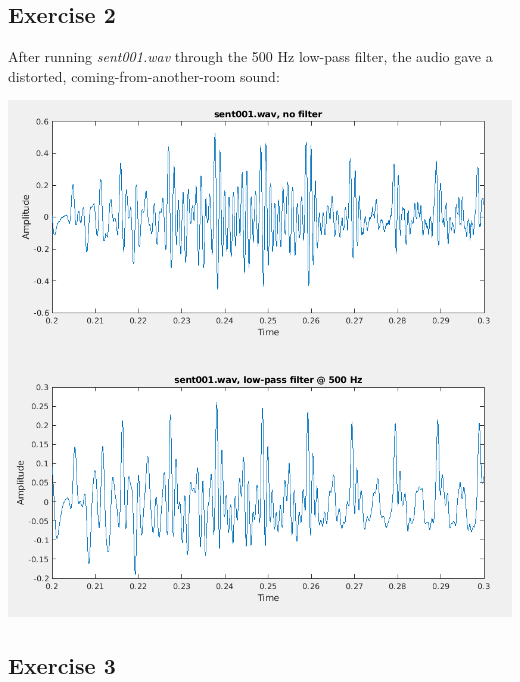 \documentclass[11pt]{article}
\begin{document}
\subsection{Exercise 2}

After running \textit{sent001.wav} through the 500 Hz low-pass filter, the audio gave a distorted, coming-from-another-room sound:



\includegraphics[width=\textwidth]{exercise2.png}

\subsection{Exercise 3}


\end{document}
